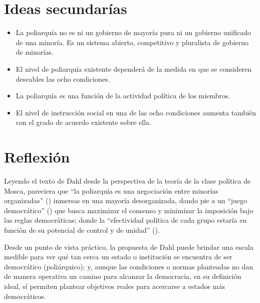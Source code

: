 \documentclass[
  letterpaper,
  DIV=11,
  numbers=noendperiod]{scrreprt}
\begin{document}
\section{Ideas secundarías}\label{ideas-secundaruxedas-1}

\begin{itemize}
\item
  La poliarquía no es ni un gobierno de mayoría pura ni un gobierno
  unificado de una minoría. Es un sistema abierto, competitivo y
  pluralista de gobierno de minorías.
\item
  El nivel de poliarquía existente dependerá de la medida en que se
  consideren deseables las ocho condiciones.
\item
  La poliarquía es una función de la actividad política de los miembros.
\item
  El nivel de instrucción social en una de las ocho condiciones aumenta
  también con el grado de acuerdo existente sobre ella.
\end{itemize}

\section{Reflexión}\label{reflexiuxf3n-1}

Leyendo el texto de Dahl desde la perspectiva de la teoría de la clase
política de Mosca, pareciera que ``la poliarquía es una negociación
entre minorías organizadas'' ()
inmersas en una mayoría desorganizada, dando pie a un ``juego
democrático'' () que busca
maximizar el consenso y minimizar la imposición bajo las reglas
democráticas; donde la ``efectividad política de cada grupo estaría en
función de su potencial de control y de unidad''
().

Desde un punto de vista práctico, la propuesta de Dahl puede brindar una
escala medible para ver qué tan cerca un estado o institución se
encuentra de ser democrático (poliárquico); y, aunque las condiciones o
normas planteadas no dan de manera operativa un camino para alcanzar la
democracia, en su definición ideal, sí permiten plantear objetivos
reales para acercarse a estados más democráticos.
\end{document}
